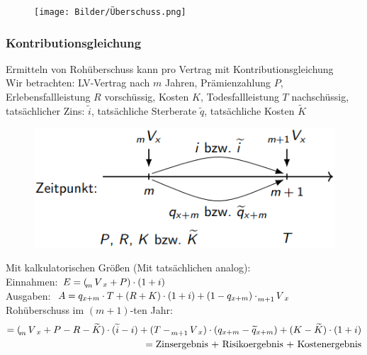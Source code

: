 \documentclass[12pt]{report}
\theoremstyle{dotless}
\theoremstyle{definition}
\begin{document}
\begin{figure}[ht]
	\centering
	\texttt{[image: Bilder/Überschuss.png]}
\end{figure}

\subsubsection{Kontributionsgleichung}
Ermitteln von Rohüberschuss kann pro Vertrag mit Kontributionsgleichung \\
Wir betrachten: LV-Vertrag nach $m$ Jahren, Prämienzahlung $P$, Erlebensfallleistung $R$ vorschüssig, Kosten $K$, Todesfallleistung $T$ nachschüssig, tatsächlicher Zins: $\widetilde{i}$, tatsächliche Sterberate $\widetilde{q}$, tatsächliche Kosten $\widetilde{K}$


\begin{figure}[ht]
	\centering
	\includegraphics[width = .8\textwidth]{Bilder/Kontributionsgleichung.png}
\end{figure}

Mit kalkulatorischen Größen (Mit tatsächlichen analog): \\
Einnahmen: $E=(\tensor[_m]{V}{}_x + P) \cdot (1+i)$\\
Ausgaben: $A=q_{x+m} \cdot T + (R+K) \cdot (1+i) + (1-q_{x+m})\cdot \tensor[_{m+1}]{V}{}_x$\\
Rohüberschuss im $(m+1)$-ten Jahr:
\begin{align}
=(\tensor[_m]{V}{}_x + P - R - \widetilde{K}) \cdot (\widetilde{i}-i) + (T -\tensor[_{m+1}]{V}{}_x) \cdot (q_{x+m} - \widetilde{q}_{x+m})+(K - \widetilde{K} ) \cdot (1+i) \\ = \text{Zinsergebnis + Risikoergebnis + Kostenergebnis}
\end{align}
\end{document}

